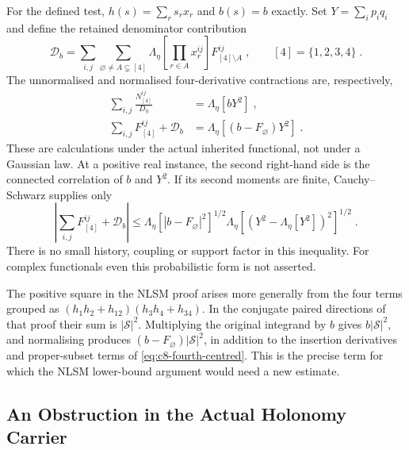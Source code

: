 \documentclass[11pt]{article}
\begin{document}
For the defined test, $h(s)=\sum_rs_rx_r$ and $b(s)=b$ exactly.
Set $Y=\sum_ip_iq_i$ and define the retained denominator contribution
\begin{equation}\label{eq:c8-fourth-denominator}
    \mathcal D_b=\sum_{i,j}\sum_{\varnothing\neq A\subsetneq[4]}
        \Lambda_\eta\left[\prod_{r\in A}x_r^{ij}\right]
        F^{ij}_{[4]\setminus A}\;,
    \qquad [4]=\{1,2,3,4\}\;.
\end{equation}
The unnormalised and normalised four-derivative contractions are,
respectively,
\begin{align}
    \sum_{i,j}\frac{N^{ij}_{[4]}}{D_\eta}
        &=\Lambda_\eta[bY^2]\;,
        \label{eq:c8-fourth-square}\\
    \sum_{i,j}F^{ij}_{[4]}+\mathcal D_b
        &=\Lambda_\eta[(b-F_\varnothing)Y^2]\;.
        \label{eq:c8-fourth-connected-square}
\end{align}
These are calculations under the actual inherited functional, not under
a Gaussian law. At a positive real instance, the second right-hand side
is the connected correlation of $b$ and $Y^2$. If its second moments
are finite, Cauchy--Schwarz supplies only
\begin{equation}\label{eq:c8-fourth-cs}
    \left|\sum_{i,j}F^{ij}_{[4]}+\mathcal D_b\right|
        \leq\Lambda_\eta[|b-F_\varnothing|^2]^{1/2}
        \Lambda_\eta[(Y^2-\Lambda_\eta[Y^2])^2]^{1/2}\;.
\end{equation}
There is no small history, coupling or support factor in this inequality.
For complex functionals even this probabilistic form is not asserted.

The positive square in the NLSM proof arises more generally from the
four terms grouped as
$(h_1h_2+h_{12})(h_3h_4+h_{34})$. In the conjugate paired directions
of that proof their sum is $|\mathcal S|^2$. Multiplying the original
integrand by $b$ gives $b|\mathcal S|^2$, and normalising produces
$(b-F_\varnothing)|\mathcal S|^2$, in addition to the insertion
derivatives and proper-subset terms of \eqref{eq:c8-fourth-centred}.
This is the precise term for which the NLSM lower-bound argument would
need a new estimate.

\subsection{An Obstruction in the Actual Holonomy Carrier}
\end{document}
